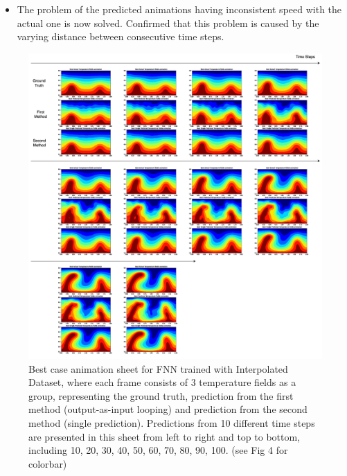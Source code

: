 {\begin{itemize}
\begin{itemize}
            \item The problem of the predicted animations having inconsistent speed with the actual one is now solved. Confirmed that this problem is caused by the varying distance between consecutive time steps.

    \end{itemize}

\end{itemize}

\begin{figure}[H]
    \centering
    \includegraphics[width=0.9\linewidth]{figures/FNN_animation_sheet.png}
    \caption{Best case animation sheet for FNN trained with Interpolated Dataset, where each frame consists of 3 temperature fields as a group, representing the ground truth, prediction from the first method (output-as-input looping) and prediction from the second method (single prediction). Predictions from 10 different time steps are presented in this sheet from left to right and top to bottom, including 10, 20, 30, 40, 50, 60, 70, 80, 90, 100. (see Fig 4 for colorbar)}
\end{figure}

}

